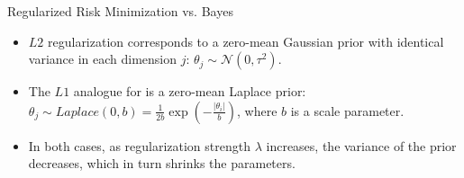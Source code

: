 \begin{vbframe} {Regularized Risk Minimization vs. Bayes}
\begin{itemize}
  \item $L2$ regularization corresponds to a zero-mean Gaussian prior with 
  identical variance in each dimension $j$: 
  $\theta_j \sim \mathcal{N}(0, \tau^2)$.
  \item The $L1$ analogue for is a zero-mean Laplace prior: 
  $\theta_j \sim \mathit{Laplace}(0,b) = 
  \frac{1}{2b}\exp(-\frac{|\theta_i|}{b})$, where $b$ is a scale parameter.
  \item In both cases, as regularization strength $\lambda$ increases, the 
  variance of the prior decreases, which in turn shrinks the parameters.
\end{itemize}
  
\end{vbframe}


